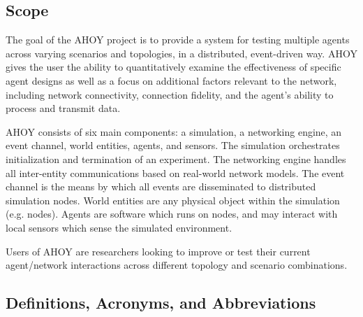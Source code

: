 \documentclass[titlepage]{article}
\begin{document}

\subsection{Scope%
  \label{scope}%
}
The goal of the AHOY project is to provide a system for testing multiple agents across varying scenarios and topologies, in a distributed, event-driven way. AHOY gives the user the ability to quantitatively examine the effectiveness of specific agent designs as well as a focus on additional factors relevant to the network, including network connectivity, connection fidelity, and the agent's ability to process and transmit data.

AHOY consists of six main components: a simulation, a networking engine, an event channel, world entities, agents, and sensors.  The simulation orchestrates initialization and termination of an experiment.  The networking engine handles all inter-entity communications based on real-world network models.  The event channel is the means by which all events are disseminated to distributed simulation nodes.  World entities are any physical object within the simulation (e.g. nodes).  Agents are software which runs on nodes, and may interact with local sensors which sense the simulated environment.

Users of AHOY are researchers looking to improve or test their current agent/network interactions across different topology and scenario combinations.  

\subsection{Definitions, Acronyms, and Abbreviations%
  \label{definitions}%
}
\end{document}
